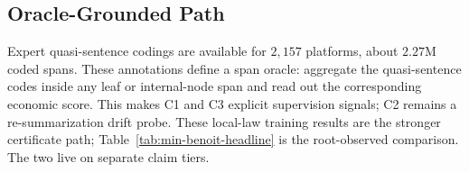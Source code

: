 \subsection{Oracle-Grounded Path}

Expert quasi-sentence codings are available for $2{,}157$ platforms,
about $2.27$M coded spans. These annotations define a span oracle:
aggregate the quasi-sentence codes inside any leaf or internal-node span
and read out the corresponding economic score. This makes C1 and C3
explicit supervision signals; C2 remains a re-summarization drift probe.
These local-law training results are the stronger certificate path;
Table~\ref{tab:min-benoit-headline} is the root-observed comparison. The
two live on separate claim tiers.
